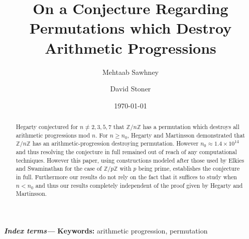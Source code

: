 \documentclass[12pt]{amsart}
\title{On a Conjecture Regarding Permutations which Destroy Arithmetic Progressions}
\author{Mehtaab Sawhney}
\author{David Stoner}
\date{\today}
\providecommand{\keywords}[1]{\textbf{\textit{Index terms---}} #1}
\theoremstyle{definition}
\theoremstyle{remark}
\newcommand{\Z}{\mathbb Z}
\begin{document}
\maketitle
\vspace{-10mm}
\begin{abstract}
Hegarty conjectured for $n\neq 2, 3, 5, 7$ that $\Z/n\Z$ has a permutation which destroys all arithmetic progressions mod $n$. For $n\ge n_0$, Hegarty and Martinsson demonstrated that $\mathbb{Z}/n\Z$ has an arithmetic-progression destroying permutation. However $n_0\approx 1.4\times 10^{14}$ and thus resolving the conjecture in full remained out of reach of any computational techniques. However this paper, using constructions modeled after those used by Elkies and Swaminathan for the case of $\Z/p\Z$ with $p$ being prime, establishes the conjecture in full. Furthermore our results do not rely on the fact that it suffices to study when $n<n_0$ and thus our results completely independent of the proof given by Hegarty and Martinsson.
\end{abstract}
\keywords{\textbf{Keywords: }arithmetic progression, permutation}

\end{document}

